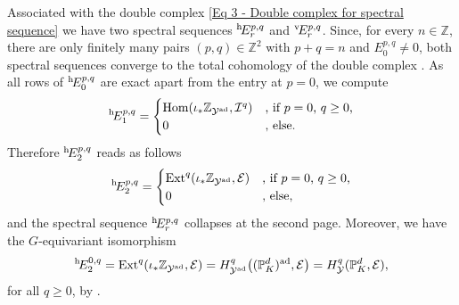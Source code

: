 \documentclass[a4paper, reqno, 10pt]{amsart}
\theoremstyle{definition}
\numberwithin{equation}{section}
\newcommand{\ad}{{\mathrm{ad}}}
\newcommand{\Ext}{{\mathrm{Ext}}}
\newcommand{\Hom}{{\mathrm{Hom}}}
\newcommand{\BP}{{\mathbb {P}}}
\newcommand{\BZ}{{\mathbb {Z}}}
\newcommand{\CE}{{\mathcal {E}}}
\newcommand{\CI}{{\mathcal {I}}}
\newcommand{\CY}{{\mathcal {Y}}}
\begin{document}
Associated with the double complex \eqref{Eq 3 - Double complex for spectral sequence} we have two spectral sequences $^{\rm h}\!E^{p,q}_r$ and $^{\rm v}\!E^{p,q}_r$.
Since, for every $n\in \BZ$, there are only finitely many pairs $(p,q)\in \BZ^2$ with $p+q=n$ and $E^{p,q}_0 \neq 0$, both spectral sequences converge to the total cohomology of the double complex \cite[\href{https://stacks.math.columbia.edu/tag/0132}{Tag 0132}]{StacksProject}.
As all rows of $^{\rm h}\!E^{p,q}_0$ are exact apart from the entry at $p=0$, we compute
\begin{equation*}
	^{\rm h}\! E_1^{p,q} = \begin{cases}
		\Hom ( \iota_\ast \BZ_{\CY^\ad} , \CI^q ) & \text{, if $p=0$, $q\geq 0$,} \\
		0 & \text{, else.}
	\end{cases}
\end{equation*}
Therefore $^{\rm h}\! E_2^{p,q}$ reads as follows
\begin{equation*}
	^{\rm h}\! E_2^{p,q} = \begin{cases}
		\Ext^q( \iota_\ast \BZ_{\CY^\ad}, \CE ) & \text{, if $p=0$, $q\geq 0$,} \\
		0& \text{, else,}
	\end{cases}
\end{equation*}
and the spectral sequence $^{\rm h}\! E_r^{p,q}$ collapses at the second page.
Moreover, we have the $G$-equivariant isomorphism
\begin{equation*}
	^{\rm h}\! E_2^{0,q} = \Ext^q (\iota_\ast \BZ_{\CY^\ad}, \CE ) = H^q_{\CY^\ad} \big((\BP^d_K)^\ad, \CE \big) = H^q_\CY (\BP^d_K, \CE) ,
\end{equation*}
for all $q \geq 0$, by \cite[Prop.\ 2.3 bis.]{Grothendieck68SGA2}.
\end{document}
